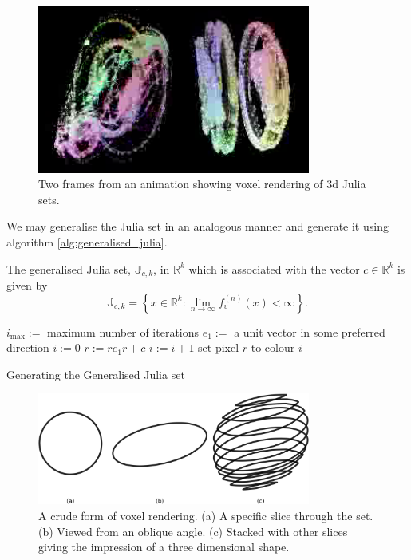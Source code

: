 \begin{figure}
\centering
\includegraphics[width=0.8\textwidth]{3djulia_pair}
\caption{\label{fig:3djulia}
  Two frames from an animation\cite{FRAC:JuliaAnimation} showing voxel
          rendering of 3d Julia sets.}
\end{figure}

We may generalise the Julia set in an analogous manner and generate it
using algorithm \ref{alg:generalised_julia}.

\begin{definition}
The generalised Julia set, $\mathbb{J}_{c,k}$, in $\mathbb{R}^k$
which is associated with the vector $c \in \mathbb{R}^k$ is given by
\[
\mathbb{J}_{c,k} = 
\left\{x \in \mathbb{R}^k
: \lim_{n \rightarrow \infty} f_v^{(n)}(x) < \infty \right\}.
\]
\end{definition}

\begin{fancyalg}
\begin{algorithmic}[1]
\STATE $i_{\mathrm{max}} :=$ maximum number of iterations
\STATE $e_1 :=$ a unit vector in some preferred direction
\STATE $i := 0$
  \STATE $r := re_1r + c$
  \STATE $i := i+1$
\ENDWHILE 
\STATE set pixel $r$ to colour $i$
\ENDFOR
\end{algorithmic}
\caption{
\label{alg:generalised_julia}
  Generating the Generalised Julia set}
\end{fancyalg}

\begin{figure}
\centering
\includegraphics[width=0.8\textwidth]{voxel}
\caption{\label{fig:voxel}
  A crude form of voxel rendering. (a) A specific slice through the set. (b) Viewed from
  an oblique angle. (c) Stacked with other slices giving the impression of a three
  dimensional shape.
}
\end{figure}

